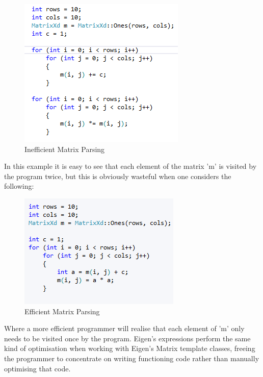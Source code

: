 \documentclass[a4paper]{amsart}
\begin{document}
\begin{figure}[h]
\centering
\includegraphics[scale=1.0]{Expressions1.png}
\caption {Inefficient Matrix Parsing}
\label {fig:Expr1}
\end{figure}

In this example it is easy to see that each element of the matrix 'm' is visited by the program twice, but this is obviously wasteful when one considers the following:\\


\begin{figure}[h]
\centering
\includegraphics[scale=1.0]{Expressions2.png}
\caption {Efficient Matrix Parsing}
\label {fig:Expr2}
\end{figure}



Where a more efficient programmer will realise that each element of 'm' only needs to be visited once by the program. Eigen's expressions perform the same kind of optimisation when working with Eigen's Matrix template classes, freeing the programmer to concentrate on writing functioning code rather than manually optimising that code.
\end{document}
